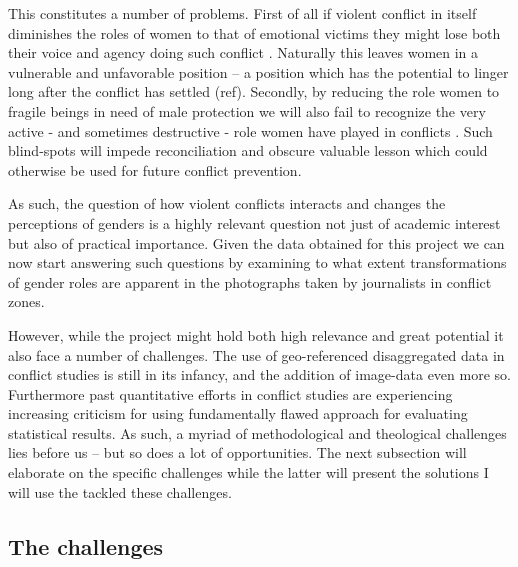 \documentclass[a4paper]{article}
\begin{document}
This constitutes a number of problems. First of all if violent conflict in itself diminishes the roles of women to that of emotional victims they might lose both their voice and agency doing such conflict \citep{hansen2000gender, hansen2000little}. Naturally this leaves women in a vulnerable and unfavorable position \citep[XXX]{hansen2000little} -- a position which has the potential to linger long after the conflict has settled (ref). Secondly, by reducing the role women to fragile beings in need of male protection we will also fail to recognize the very active - and sometimes destructive - role women have played in conflicts \citep[XXX]{hansen2000gender}. Such blind-spots will impede reconciliation and obscure valuable lesson which could otherwise be used for future conflict prevention.\par

As such, the question of how violent conflicts interacts and changes the perceptions of genders is a highly relevant question not just of academic interest but also of practical importance. Given the data obtained for this project we can now start answering such questions by examining to what extent transformations of gender roles are apparent in the photographs taken by journalists in conflict zones.\par

However, while the project might hold both high relevance and great potential it also face a number of challenges. The use of geo-referenced disaggregated data in conflict studies is still in its infancy, and the addition of image-data even more so. Furthermore past quantitative efforts in conflict studies are experiencing increasing criticism for using fundamentally flawed approach for evaluating statistical results. As such, a myriad of methodological and theological challenges lies before us -- but so does a lot of opportunities. The next subsection will elaborate on the specific challenges while the latter will present the solutions I will use the tackled these challenges.\par


\subsection{The challenges}
\end{document}
